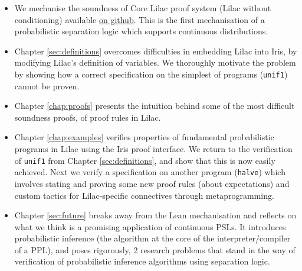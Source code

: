 \begin{itemize}
\item We mechanise the soundness of Core Lilac proof system (Lilac without conditioning) available \href{https://github.com/edwin1729/bppl-logic/tree/submission}{on github}.
This is the first mechanisation of a probabilistic separation logic which supports continuous distributions.
\item Chapter \ref{sec:definitions} overcomes difficulties in embedding Lilac into Iris, by modifying Lilac's definition of variables. We thoroughly
motivate the problem by showing how a correct specification on the simplest of programs (\texttt{unif1}) cannot be proven.
\item Chapter \ref{chap:proofs} presents the intuition behind some of the most difficult soundness proofs, of proof rules in Lilac.
\item Chapter \ref{chap:examples} verifies properties of fundamental probabilistic programs in Lilac using the Iris proof interface. We return to
the verification of \texttt{unif1} from Chapter \ref{sec:definitions}, and show that this is now easily achieved. Next we verify a specification
on another program (\texttt{halve}) which involves stating and proving some new proof rules (about expectations) and custom tactics for Lilac-specific connectives
through metaprogramming.
\item Chapter \ref{sec:future} breaks away from the Lean mechanisation and reflects on what we think is a promising application of continuous PSLs.
It introduces probabilistic inference (the algorithm at the core of the interpreter/compiler of a PPL), and poses rigorously, 2 research problems that
stand in the way of verification of probabilistic inference algorithms using separation logic.
\end{itemize}

